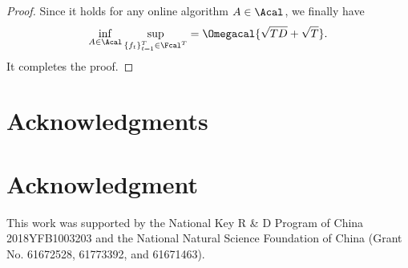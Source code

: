 \documentclass[journal]{IEEEtran}
\begin{document}
\begin{proof}
Since it holds for any online algorithm $A\in \Acal$, we finally have 
\begin{align}
\nonumber
\inf_{A\in\Acal} \sup_{\{f_{t}\}_{t=1}^T \in \Fcal^T}  = \Omegacal{\sqrt{TD} + \sqrt{T}}.
\end{align} It completes the proof.
\end{proof}















\ifCLASSOPTIONcompsoc
  \section*{Acknowledgments}
\else
  \section*{Acknowledgment}
\fi


This work was supported by the National Key R \& D Program of China 2018YFB1003203 and the National Natural Science Foundation of China (Grant No. 61672528, 61773392, and 61671463). 

\ifCLASSOPTIONcaptionsoff
  \newpage
\fi







%
%
\end{document}
